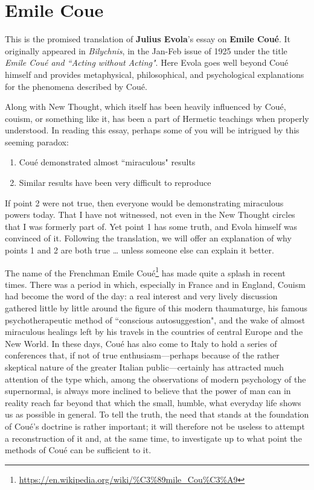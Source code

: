 \section{Emile Coue}
\label{sec:Coue}
\begin{quotationx}
This is the promised translation of \textbf{Julius Evola}'s essay on \textbf{Emile Coué}. It originally appeared in \emph{Bilychnis}, in the Jan-Feb issue of 1925 under the title \textit{Emile Coué and ``Acting without Acting"}. Here Evola goes well beyond Coué himself and provides metaphysical, philosophical, and psychological explanations for the phenomena described by Coué.

Along with New Thought, which itself has been heavily influenced by Coué, couism, or something like it, has been a part of Hermetic teachings when properly understood. In reading this essay, perhaps some of you will be intrigued by this seeming paradox:

\begin{enumerate}
\item Coué demonstrated almost ``miraculous" results 
\item Similar results have been very difficult to reproduce 
\end{enumerate}

If point 2 were not true, then everyone would be demonstrating miraculous powers today. That I have not witnessed, not even in the New Thought circles that I was formerly part of. Yet point 1 has some truth, and Evola himself was convinced of it. Following the translation, we will offer an explanation of why points 1 and 2 are both true … unless someone else can explain it better. 

\end{quotationx}

The name of the Frenchman Emile Coué\footnote{\url{https://en.wikipedia.org/wiki/\%C3\%89mile_Cou\%C3\%A9}} has made quite a splash in recent times. There was a period in which, especially in France and in England, Couism had become the word of the day: a real interest and very lively discussion gathered little by little around the figure of this modern thaumaturge, his famous psychotherapeutic method of ``conscious autosuggestion", and the wake of almost miraculous healings left by his travels in the countries of central Europe and the New World. In these days, Coué has also come to Italy to hold a series of conferences that, if not of true enthusiasm—perhaps because of the rather skeptical nature of the greater Italian public—certainly has attracted much attention of the type which, among the observations of modern psychology of the supernormal, is always more inclined to believe that the power of man can in reality reach far beyond that which the small, humble, what everyday life shows us as possible in general. To tell the truth, the need that stands at the foundation of Coué's doctrine is rather important; it will therefore not be useless to attempt a reconstruction of it and, at the same time, to investigate up to what point the methods of Coué can be sufficient to it.

